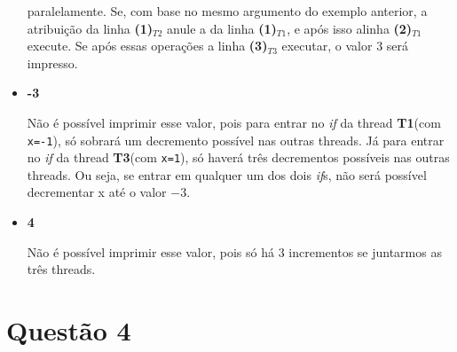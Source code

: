 \documentclass{article}
\newcommand{\Tu}{\textbf{T1}}
\newcommand{\Tt}{\textbf{T3}}
\newcommand{\TL}[2]{\textbf{(#1)}$_{T#2}$}
\begin{document}
\begin{itemize}
		paralelamente. Se, com base no mesmo argumento do exemplo anterior, a atribuição da linha \TL{1}{2} anule a da linha
		\TL{1}{1}, e após isso alinha \TL{2}{1} execute. Se após essas operações a linha \TL{3}{3} executar, o valor 3 será
		impresso.
	\item \textbf{-3}\par
		Não é possível imprimir esse valor, pois para entrar no \emph{if} da thread \Tu (com \texttt{x=-1}), só sobrará um
		decremento possível nas outras threads. Já para entrar no \emph{if} da thread \Tt (com \texttt{x=1}), só haverá três
		decrementos possíveis nas outras threads. Ou seja, se entrar em qualquer um dos dois \emph{if}s, não será possível
		decrementar x até o valor $-3$.
	\item \textbf{4}\par
		Não é possível imprimir esse valor, pois só há 3 incrementos se juntarmos as três threads.
\end{itemize}

\section*{Questão 4}
\end{document}
